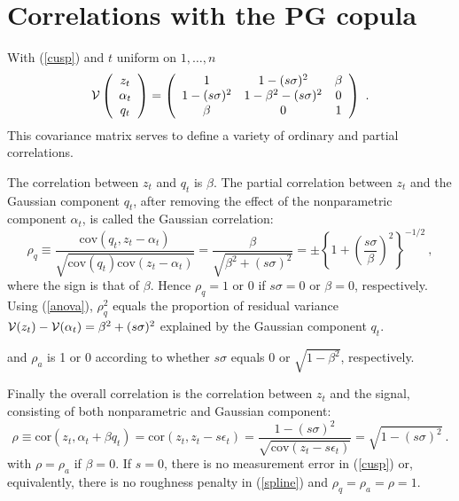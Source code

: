 \documentclass[authoryear]{elsarticle}
\newcommand{\cov}{\mathrm{cov}}
\newcommand{\eps}{\epsilon}
\newcommand{\cor}{\mathrm{cor}}
\newcommand{\eref}[1]{(\ref{#1})}
\newcommand{\Vx}{{\cal V}}
\newcommand{\be}[1]{\begin{equation}\label{#1}}
\newcommand{\ee}{\end{equation}}
\begin{document}
\section{Correlations with the PG copula}
With \eref{cusp}  and $t$ uniform on $1,\ldots,n$ 
$$
\Vx\left(\begin{array}{c} z_t\\ \alpha_t\\ q_t\\ \end{array}\right)
=\left(\begin{array}{ccc} 
1 & 1-(s\sigma)^2 & \beta\\
1-(s\sigma)^2 & 1-\beta^2-(s\sigma)^2 & 0\\
\beta & 0 & 1\\
\end{array}\right)\ .
$$
This covariance matrix serves to define a variety of ordinary and partial correlations.

The correlation between $z_t$ and $q_t$ is  $\beta$.  The partial correlation between $z_t$ and  the Gaussian component $q_t$, after removing the effect of the nonparametric component $\alpha_t$,  is called the Gaussian correlation:
\be{rho}
\rho_q\equiv\frac{\cov(q_t,z_t-\alpha_t)}{\sqrt{\cov(q_t)\cov(z_t-\alpha_t)}} = \frac{\beta}{\sqrt{\beta^2+(s\sigma)^2}}=\pm\left\{1+\left(\frac{s\sigma}{\beta}\right)^2\right\}^{-1/2}\ ,
\ee
where the sign is that of $\beta$.  Hence $\rho_q=1$ or 0 if  $s\sigma=0$ or $\beta=0$, respectively.
Using \eref{anova},  $\rho_q^2$ equals the proportion of  residual variance $\Vx(z_t)-\Vx(\alpha_t)=\beta^2+(s\sigma)^2$ explained by  the Gaussian component $q_t$.   
 

and  $\rho_a$ is 1 or 0 according to whether  $s\sigma$ equals 0 or  $\sqrt{1-\beta^2}$, respectively. 

Finally the overall correlation is the correlation between $z_t$ and the signal, consisting of both nonparametric and Gaussian component:
$$
\rho\equiv\cor (z_t,\alpha_t+\beta q_t)=\cor(z_t,z_t-s\eps_t)=\frac{1-(s\sigma)^2}{\sqrt{\cov(z_t-s\eps_t)}}=\sqrt{1-(s\sigma)^2}\ .
$$
with $\rho=\rho_a$ if $\beta=0$.   If $s=0$, there is no measurement error in \eref{cusp} or, equivalently, there is no roughness penalty in \eref{spline} and $\rho_q=\rho_a=\rho=1$.
\end{document}
